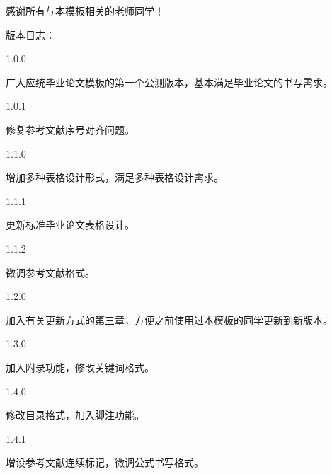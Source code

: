 \acknowledgement
感谢所有与本模板相关的老师同学！\par
版本日志：\par
1.0.0\par
广大应统毕业论文模板的第一个公测版本，基本满足毕业论文的书写需求。\par
1.0.1\par
修复参考文献序号对齐问题。\par
1.1.0\par
增加多种表格设计形式，满足多种表格设计需求。\par
1.1.1\par
更新标准毕业论文表格设计。\par
1.1.2\par
微调参考文献格式。\par
1.2.0\par
加入有关更新方式的第三章，方便之前使用过本模板的同学更新到新版本。\par
1.3.0\par
加入附录功能，修改关键词格式。\par
1.4.0\par
修改目录格式，加入脚注功能。\par
1.4.1\par
增设参考文献连续标记，微调公式书写格式。
\newpage
\cleardoublepage
